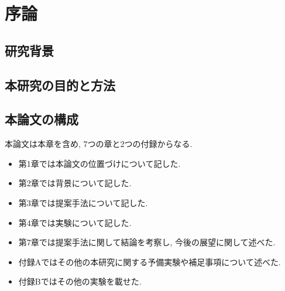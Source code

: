 \chapter{序論}

\section{研究背景}

\section{本研究の目的と方法}

\section{本論文の構成}
本論文は本章を含め, 7つの章と2つの付録からなる.
\begin{itemize}
	\item 第1章では本論文の位置づけについて記した.
	\item 第2章では背景について記した.
	\item 第3章では提案手法について記した.
	\item 第4章では実験について記した.
	\item 第7章では提案手法に関して結論を考察し, 今後の展望に関して述べた.
	\item 付録Aではその他の本研究に関する予備実験や補足事項について述べた.
	\item 付録Bではその他の実験を載せた.
\end{itemize}